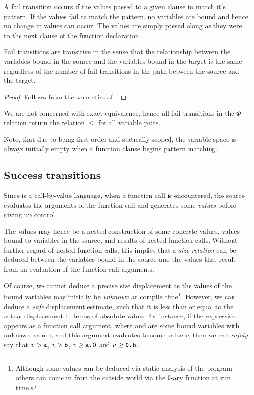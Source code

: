 A fail transition occurs if the values passed to a given clause to match it's
pattern. If the values fail to match the pattern, no variables are bound and
hence no change in values can occur. The values are simply passed along as they
were to the next clause of the function declaration.

\begin{lemma} Fail transitions are transitive in the sense that the
relationship between the variables bound in the source and the variables bound
in the target is the same regardless of the number of fail transitions in
the path between the source and the target.\end{lemma}

\begin{proof} Follows from the semantics of \D{}. \end{proof}

We are not concerned with exact equivalence, hence all fail transitions in the
$\Phi$ relation return the relation $\leq$ for all variable pairs.

Note, that due to \D{} being first order and statically scoped, the variable
space is always initially empty when a function clause begins pattern matching.

\subsection{Success transitions}

Since \D{} is a call-by-value language, when a function call is encountered,
the source evaluates the arguments of the function call and generates some
\emph{values} before giving up control.

The values may hence be a nested construction of some concrete values, values
bound to variables in the source, and results of nested function calls. Without
further regard of nested function calls, this implies that a \emph{size
relation} can be deduced between the variables bound in the source and the
values that result from an evaluation of the function call arguments. 

Of course, we cannot deduce a precise size displacement as the values of the
bound variables may initially be \emph{unknown} at compile
time\footnote{Although some values can be deduced via static analysis of the
program, others can come in from the outside world via the 0-ary function
 at run time.}.  However, we can deduce a \emph{safe} displacement
estimate, such that it is less than or equal to the actual displacement in
terms of absolute value. For instance, if the expression  appears as
a function call argument, where  and  are some bound variables
with unknown values, and this argument evaluates to some value $v$, then we can
\emph{safely} say that $v>\text{{\ttfamily a}}$, $v>\text{{\ttfamily b}}$,
$v\geq\text{{\ttfamily a.0}}$ and $v\geq\text{{\ttfamily0.b}}$.

